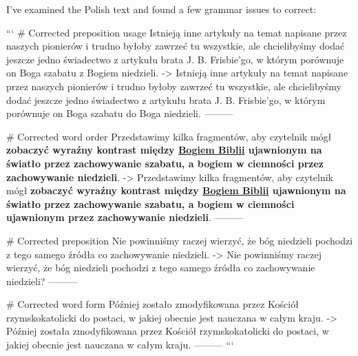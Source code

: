 I've examined the Polish text and found a few grammar issues to correct:

```
# Corrected preposition usage
Istnieją inne artykuły na temat  napisane przez naszych pionierów i trudno byłoby zawrzeć tu wszystkie, ale chcielibyśmy dodać jeszcze jedno świadectwo z artykułu brata J. B. Frisbie'go, w którym porównuje on Boga szabatu z Bogiem niedzieli.
->
Istnieją inne artykuły na temat  napisane przez naszych pionierów i trudno byłoby zawrzeć tu wszystkie, ale chcielibyśmy dodać jeszcze jedno świadectwo z artykułu brata J. B. Frisbie'go, w którym porównuje on Boga szabatu do Boga niedzieli.
---------

# Corrected word order
Przedstawimy kilka fragmentów, aby czytelnik mógł \textbf{zobaczyć wyraźny kontrast między \underline{Bogiem Biblii} ujawnionym na światło przez zachowywanie szabatu, a bogiem w ciemności przez zachowywanie niedzieli}.
->
Przedstawimy kilka fragmentów, aby czytelnik mógł \textbf{zobaczyć wyraźny kontrast między \underline{Bogiem Biblii} ujawnionym na światło przez zachowywanie szabatu, a bogiem w ciemności ujawnionym przez zachowywanie niedzieli}.
---------

# Corrected preposition
Nie powinniśmy raczej wierzyć, że bóg niedzieli pochodzi z tego samego źródła co zachowywanie niedzieli.
->
Nie powinniśmy raczej wierzyć, że bóg niedzieli pochodzi z tego samego źródła co zachowywanie niedzieli?
---------

# Corrected word form
Później zostało zmodyfikowana przez Kościół rzymskokatolicki do postaci, w jakiej obecnie jest nauczana w całym kraju.
->
Później została zmodyfikowana przez Kościół rzymskokatolicki do postaci, w jakiej obecnie jest nauczana w całym kraju.
---------
```